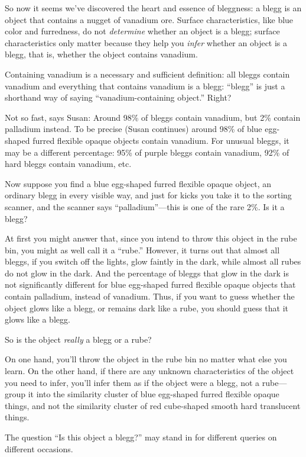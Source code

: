{
 So now it seems we've discovered the heart and
essence of bleggness: a blegg is an object that contains a nugget of
vanadium ore. Surface characteristics, like blue color and furredness,
do not \textit{determine} whether an object is a blegg; surface
characteristics only matter because they help you \textit{infer}
whether an object is a blegg, that is, whether the object contains
vanadium.}

{
 Containing vanadium is a necessary and sufficient definition: all
bleggs contain vanadium and everything that contains vanadium is a
blegg: ``blegg'' is just a shorthand
way of saying ``vanadium-containing
object.'' Right?}

{
 Not so fast, says Susan: Around 98\% of bleggs contain vanadium,
but 2\% contain palladium instead. To be precise (Susan continues)
around 98\% of blue egg-shaped furred flexible opaque objects contain
vanadium. For unusual bleggs, it may be a different percentage: 95\% of
purple bleggs contain vanadium, 92\% of hard bleggs contain vanadium,
etc.}

{
 Now suppose you find a blue egg-shaped furred flexible opaque
object, an ordinary blegg in every visible way, and just for kicks you
take it to the sorting scanner, and the scanner says
``palladium''---this is one of the
rare 2\%. Is it a blegg?}

{
 At first you might answer that, since you intend to throw this
object in the rube bin, you might as well call it a
``rube.'' However, it turns out that
almost all bleggs, if you switch off the lights, glow faintly in the
dark, while almost all rubes do not glow in the dark. And the
percentage of bleggs that glow in the dark is not significantly
different for blue egg-shaped furred flexible opaque objects that
contain palladium, instead of vanadium. Thus, if you want to guess
whether the object glows like a blegg, or remains dark like a rube, you
should guess that it glows like a blegg.}

{
 So is the object \textit{really} a blegg or a rube?}

{
 On one hand, you'll throw the object in the rube
bin no matter what else you learn. On the other hand, if there are any
unknown characteristics of the object you need to infer,
you'll infer them as if the object were a blegg, not a
rube---group it into the similarity cluster of blue egg-shaped furred
flexible opaque things, and not the similarity cluster of red
cube-shaped smooth hard translucent things.}

{
 The question ``Is this object a
blegg?'' may stand in for different queries on
different occasions.}

